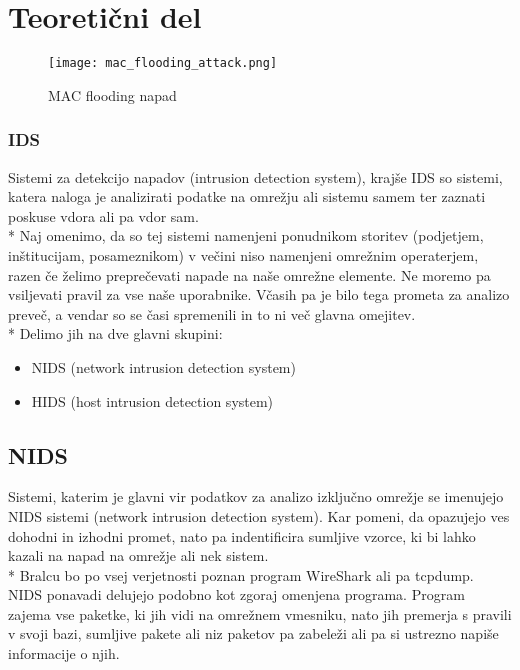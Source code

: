 \documentclass[12pt]{article}
\let\stdsection\section
\renewcommand\section{\newpage\stdsection}
\begin{document}
\section{Teoretični del}


\begin{figure}[htb]
\begin{center}
\texttt{[image: mac\_flooding\_attack.png]}
\end{center}
\caption{MAC flooding napad}
\label{mac_flooding}
\end{figure}

\subsubsection{IDS} %
\label{ssub:IDS}


Sistemi za detekcijo napadov (intrusion detection system), krajše IDS
so sistemi, katera naloga je analizirati podatke na omrežju ali sistemu samem
ter zaznati poskuse vdora ali pa vdor sam.
\\*
Naj omenimo, da so tej sistemi namenjeni ponudnikom storitev (podjetjem, inštitucijam, posameznikom)
v večini niso namenjeni omrežnim operaterjem, razen če želimo preprečevati napade na naše omrežne elemente. 
Ne moremo pa vsiljevati pravil za vse naše uporabnike. Včasih pa je bilo tega prometa za analizo preveč, a vendar
so se časi spremenili in to ni več glavna omejitev.
\\*
Delimo jih na dve glavni skupini:

\begin{itemize}
    \item NIDS (network intrusion detection system)
    \item HIDS (host intrusion detection system)
\end{itemize}



\subsection{NIDS}

Sistemi, katerim je glavni vir podatkov za analizo izključno omrežje se imenujejo NIDS sistemi (network intrusion detection system).
Kar pomeni, da opazujejo ves dohodni in izhodni promet, nato pa indentificira sumljive vzorce, ki bi lahko kazali na napad na omrežje ali nek sistem.
\\*
Bralcu bo po vsej verjetnosti poznan program WireShark ali pa tcpdump.
NIDS ponavadi delujejo podobno kot zgoraj omenjena programa. Program zajema vse paketke, ki jih vidi na omrežnem vmesniku,
nato jih premerja s pravili v svoji bazi, sumljive pakete ali niz paketov pa zabeleži ali pa si ustrezno napiše informacije o njih.
\end{document}
